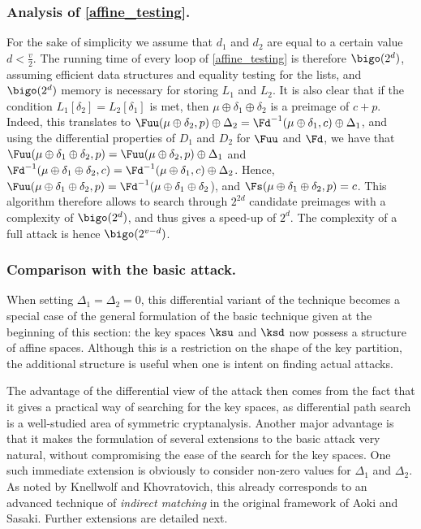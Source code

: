 \subsubsection{Analysis of \autoref{affine_testing}.}
For the sake of simplicity we assume that $d_1$ and $d_2$ are equal to a certain value $d < \frac{v}{2}$.
The running time of every loop of \autoref{affine_testing} is therefore $\bigo(2^d)$, assuming efficient
data structures and equality testing for the lists,
and $\bigo(2^d)$ memory is necessary for storing $L_1$ and $L_2$. It is also
clear that if the condition $L_1[\delta_2] = L_2[\delta_1]$ is met, then $\mu \oplus \delta_1 \oplus \delta_2$
is a preimage of $c + p$. Indeed, this translates to $\Fuu(\mu \oplus \delta_2, p) \oplus \Delta_2
= \Fd^{-1}(\mu \oplus \delta_1, c) \oplus \Delta_1$, and using the differential properties
of $D_1$ and $D_2$ for $\Fuu$ and $\Fd$, we
have that $\Fuu(\mu \oplus \delta_1 \oplus \delta_2, p) = \Fuu(\mu \oplus \delta_2, p) \oplus \Delta_1$
and $\Fd^{-1}(\mu \oplus \delta_1 \oplus \delta_2, c) = \Fd^{-1}(\mu \oplus \delta_1, c) \oplus \Delta_2$.
Hence, $\Fuu(\mu \oplus \delta_1 \oplus \delta_2, p) = \Fd^{-1}(\mu \oplus \delta_1 \oplus \delta_2$), and
$\Fs(\mu \oplus \delta_1 \oplus \delta_2, p) = c$.
This algorithm therefore allows to search through $2^{2d}$ candidate preimages with a complexity
of $\bigo(2^d)$, and thus gives a speed-up of $2^d$. The complexity of a full attack is hence $\bigo(2^{v - d})$.

\subsubsection{Comparison with the basic \mitm attack.}
When setting $\Delta_1 = \Delta_2 = 0$, this differential variant of the \mitm technique becomes a special case
of the general formulation of the basic technique given at the beginning of this section: the key spaces $\ksu$ and $\ksd$ now possess a structure
of affine spaces.
Although this is a restriction on the shape of the key partition, the additional structure is useful when one is intent on finding actual attacks.

The advantage of the differential view of the \mitm attack then comes from the fact that it gives a practical way of searching for the key spaces,
as differential path search is a well-studied area of symmetric cryptanalysis. Another major advantage is that it makes the formulation of
several extensions to the basic attack very natural, without compromising the ease of the search for the key spaces. One such immediate
extension is obviously to consider non-zero values for $\Delta_1$ and $\Delta_2$. As noted by Knellwolf and Khovratovich,
this already corresponds to an advanced technique of \emph{indirect matching} in the original framework of Aoki and Sasaki.
Further extensions are detailed next.

